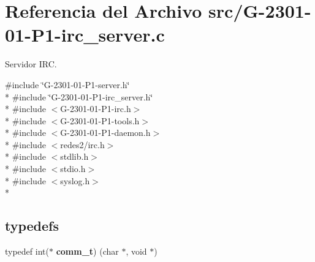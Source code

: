\hypertarget{G-2301-01-P1-irc__server_8c}{}\section{Referencia del Archivo src/\+G-\/2301-\/01-\/\+P1-\/irc\+\_\+server.c}
\label{G-2301-01-P1-irc__server_8c}


Servidor I\+R\+C.  


{\ttfamily \#include \char`\"{}G-\/2301-\/01-\/\+P1-\/server.\+h\char`\"{}}\\*
{\ttfamily \#include \char`\"{}G-\/2301-\/01-\/\+P1-\/irc\+\_\+server.\+h\char`\"{}}\\*
{\ttfamily \#include $<$G-\/2301-\/01-\/\+P1-\/irc.\+h$>$}\\*
{\ttfamily \#include $<$G-\/2301-\/01-\/\+P1-\/tools.\+h$>$}\\*
{\ttfamily \#include $<$G-\/2301-\/01-\/\+P1-\/daemon.\+h$>$}\\*
{\ttfamily \#include $<$redes2/irc.\+h$>$}\\*
{\ttfamily \#include $<$stdlib.\+h$>$}\\*
{\ttfamily \#include $<$stdio.\+h$>$}\\*
{\ttfamily \#include $<$syslog.\+h$>$}\\*
\subsection*{\textquotesingle{}typedefs\textquotesingle{}}
\begin{DoxyCompactItemize}
\item 
\hypertarget{G-2301-01-P1-irc__server_8c_a43c12d298c196cd56d8a2a1eaefac5c1}{}typedef int($\ast$ {\bfseries comm\+\_\+t}) (char $\ast$, void $\ast$)\label{G-2301-01-P1-irc__server_8c_a43c12d298c196cd56d8a2a1eaefac5c1}

\end{DoxyCompactItemize}
